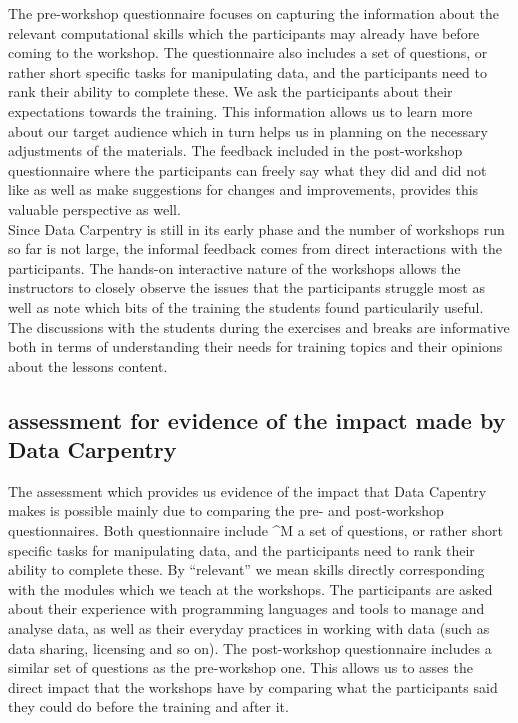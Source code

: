 \documentclass[15]{idcc}
\begin{document}
\begin{itemize}
The pre-workshop questionnaire focuses on capturing the information about the relevant computational skills which the participants may already
have before coming to the workshop. The questionnaire also includes
a set of questions, or rather short specific tasks for manipulating data, and the participants need to rank their ability to complete these.
We ask the participants about their expectations towards the training. This information allows us to learn more about our target audience which
in turn helps us in planning on the necessary adjustments of the materials. The feedback included in the post-workshop questionnaire
where the participants can freely say what they did and did not like as well as  make suggestions for changes and improvements, provides this
valuable perspective as well. \\

Since Data Carpentry is still in its early phase and the number of workshops run so far is not large, the informal feedback comes from direct interactions with the participants.
The hands-on interactive nature of the workshops allows the instructors to closely observe the issues that the participants struggle most as well as note which bits of the training the students
found particularily useful. The discussions with the students during the exercises and breaks are informative both in terms of understanding
their needs for training topics and their opinions about the lessons content.


\subsection{assessment for evidence of the impact made by Data Carpentry}
The assessment which provides us evidence of the impact that Data Capentry makes is possible mainly due to comparing the pre- and post-workshop questionnaires.
 Both questionnaire include ^M a set of questions, or rather short specific tasks for manipulating data, and the participants need to rank their ability to complete these.
By ``relevant'' we mean skills directly corresponding with the modules which we teach at the workshops. The
participants are asked about their experience with programming languages and tools to manage and analyse data, as well as their everyday practices
in working with data (such as data sharing, licensing and so on). The post-workshop questionnaire includes a similar set of questions as the
pre-workshop one. This allows us to asses the direct impact that the workshops
have by comparing what the participants said they could do before the training and after it.






\end{itemize}
\end{document}
